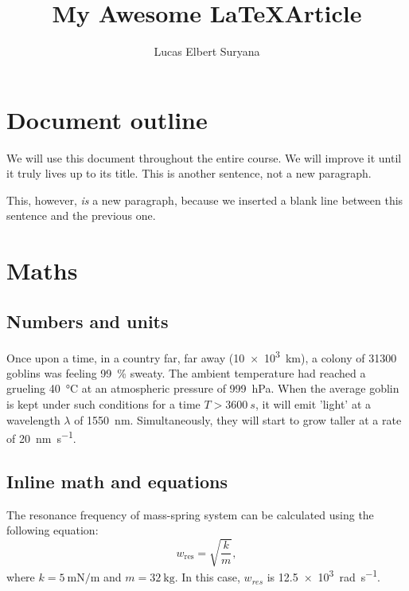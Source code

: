 \documentclass[parskip=half]{scrartcl}
\title{My Awesome \LaTeX Article}
\author{Lucas Elbert Suryana}
\begin{document}
\newcommand{\partialder}[1][t]{\frac{\partial}{\partial #1}}
\newcommand{\omegafrequency}{w_{\mathrm{res}}}

\maketitle

\section{Document outline}
We will use this document throughout the entire course. We will improve it until it truly lives up to its title. This is another sentence, not a new paragraph.

This, however, \emph{is} a new paragraph, because we inserted a blank line between this sentence and the previous one.

\section{Maths}
\label{section2}
\subsection{Numbers and units}

Once upon a time, in a country far, far away (\SI{10e3}{km}), a colony of \num{31300} goblins was feeling \SI{99}{\percent} sweaty. The ambient temperature had reached a grueling \SI{40}{\celsius} at an atmospheric pressure of \SI{999}{\hecto\pascal}. When the average goblin is kept under such conditions for a time $T>\SI{3600}{s}$, it will emit 'light' at a wavelength $\lambda$ of \SI{1550}{nm}. Simultaneously, they will start to grow taller at a rate of \SI{20}{\nano\meter\per\second}.

\subsection{Inline math and equations}

The resonance frequency of mass-spring system can be calculated using the following equation:
\begin{equation}
    \label{eq:equation1}
    w_{\mathrm{res}}=\sqrt{\frac{k}{m}},
\end{equation}
where $k=\SI{5}{\milli\newton\per\meter}$ and $m=\SI{32}{\kilogram}$. In this case, $w_{res}$ is \SI{12.5e3}{\radian\per\second}.
\end{document}
